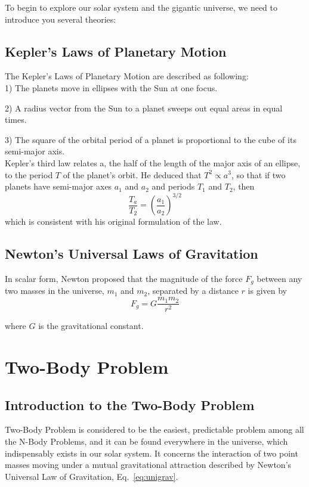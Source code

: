 To begin to explore our solar system and the gigantic universe, we need to introduce you several theories:

\subsection{Kepler's Laws of Planetary Motion}
\label{Kepler's Laws}
The Kepler's Laws of Planetary Motion are described as following: \\

1) The planets move in ellipses with the Sun at one focus.

2) A radius vector from the Sun to a planet sweeps out equal areas in
equal times.\label{Kepler Second Law}

3) The square of the orbital period of a planet is proportional to the cube of its semi-major axis. \\

Kepler’s third law relates a, the half of the length of the major axis of an ellipse, to the period $T$ of the planet’s orbit. He deduced that $T^2 \propto a^3$, so that if two planets have semi-major axes $a_1$ and $a_2$ and periods $T_1$ and $T_2$, then 
\begin{equation}
    \frac{T_a}{T_2} = (\frac{a_1}{a_2})^{3/2}
\end{equation}
which is consistent with his original formulation of the law. 

\subsection{Newton's Universal Laws of Gravitation}
In scalar form, Newton proposed that the magnitude of the force $F_g$ between any two masses in the universe, $m_1$ and $m_2$, separated by a distance $r$ is given by
\begin{equation}
F_{g} = G\frac{m_{1}m_{2}}{r^2}
\label{eq:unigrav}
\end{equation}

where $G$ is the gravitational constant.

\section{Two-Body Problem}

\subsection{Introduction to the Two-Body Problem}
Two-Body Problem is considered to be the easiest, predictable problem among all the N-Body Problems, and it can be found everywhere in the universe, which indispensably exists in our solar system. It concerns the interaction of two point masses moving under a mutual gravitational attraction described by Newton's Universal Law of Gravitation, Eq.~\ref{eq:unigrav}.

